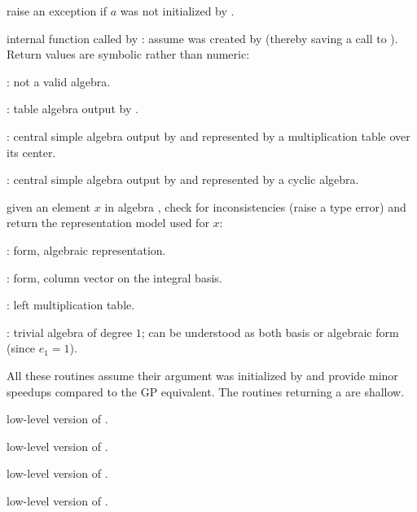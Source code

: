  raise an exception if $a$ was not initialized
by .

 internal function called by : assume
 was created by  (thereby saving a call to ).
Return values are symbolic rather than numeric:

\item {}: not a valid algebra.

\item {}: table algebra output by .

\item {}: central simple algebra output by  and
represented by a multiplication table over its center.

\item {}: central  simple  algebra  output  by  and
represented by a cyclic algebra.

 given an element $x$ in algebra ,
check for inconsistencies (raise a type error) and return the representation
model used for $x$:

\item {}:  form, algebraic representation.

\item {}:  form, column vector on the integral
basis.

\item {}: left multiplication table.

\item {}: trivial algebra of degree $1$; can be understood
as both basis or algebraic form (since $e_1 = 1$).


All these routines assume their argument was initialized by 
and provide minor speedups compared to the GP equivalent. The routines
returning a  are shallow.

 low-level version of .

 low-level version of .

 low-level version of .

 low-level version of .

